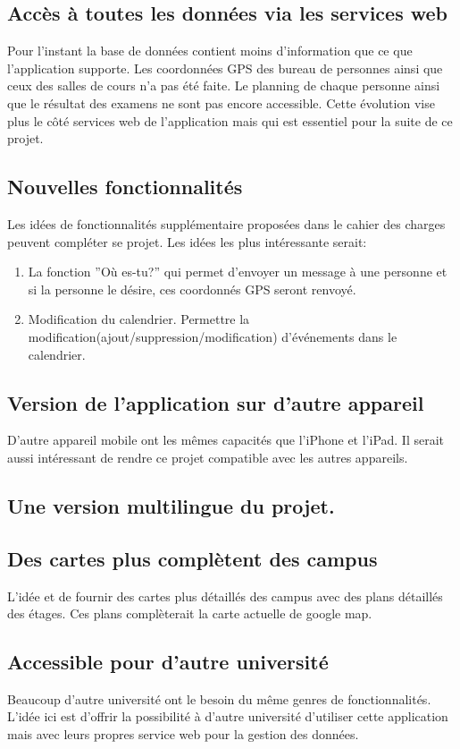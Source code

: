 \documentclass[12pt,a4paper,twoside]{report}
\begin{document}
\subsection{Accès à toutes les données via les services web }  
Pour l'instant la base de données contient moins d'information que ce que l'application supporte. Les coordonnées GPS des bureau de personnes ainsi que ceux des salles de cours n'a pas été faite. Le planning de chaque personne ainsi que le résultat des examens ne sont pas encore accessible.
Cette évolution vise plus le côté services web de l'application mais qui est essentiel pour la suite de ce projet.

\subsection{Nouvelles fonctionnalités } 
Les idées de fonctionnalités supplémentaire proposées dans le cahier des charges peuvent compléter se projet. Les idées les plus intéressante serait:
\begin{enumerate}
\item La fonction ''Où es-tu?'' qui permet d'envoyer un message à une personne et si la personne le désire, ces coordonnés GPS seront renvoyé.  
\item Modification du calendrier. Permettre la modification(ajout/suppression/modification) d'événements dans le calendrier.
\end{enumerate}

\subsection{Version de l'application sur d'autre appareil}
D'autre appareil mobile ont les mêmes capacités que l'iPhone et l'iPad. Il serait aussi intéressant de rendre ce projet compatible avec les autres appareils. 

\subsection{Une version multilingue du projet.}
\subsection{Des cartes plus complètent des campus}
L'idée et de fournir des cartes plus détaillés des campus avec des plans détaillés des étages. Ces plans complèterait la carte actuelle de google map. 

\subsection{Accessible pour d'autre université}
Beaucoup d'autre université ont le besoin du même genres de fonctionnalités. L'idée ici est d'offrir la possibilité à d'autre université d'utiliser cette application mais avec leurs propres service web pour la gestion des données.
\end{document}
